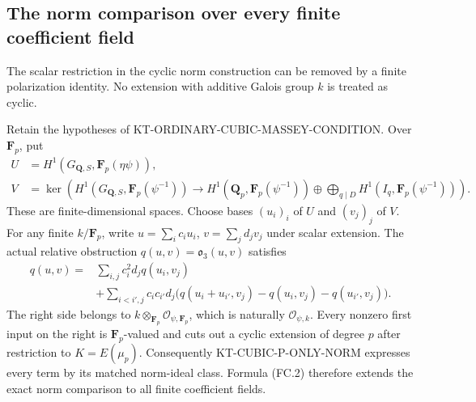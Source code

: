 \subsection{The norm comparison over every finite coefficient field}
\label{sec:kt-finite-coefficient-norm}

The scalar restriction in the cyclic norm construction can be
removed by a finite polarization identity.  No extension with
additive Galois group \(k\) is treated as cyclic.

\begin{proposition}
Retain the hypotheses of KT-ORDINARY-CUBIC-MASSEY-CONDITION.
Over \(\mathbf F_p\), put
\[
\begin{split}
 U&=H^1(G_{\mathbf Q,S},\mathbf F_p(\eta\psi)),\\
 V&=\ker\left(H^1(G_{\mathbf Q,S},\mathbf F_p(\psi^{-1}))
       \longrightarrow H^1(\mathbf Q_p,\mathbf F_p(\psi^{-1}))
           \oplus\bigoplus_{q\mid D}H^1(I_q,\mathbf F_p(\psi^{-1}))
         \right).
\end{split}                                               \tag{FC.1}
\]
These are finite-dimensional spaces.  Choose bases
\((u_i)_i\) of \(U\) and \((v_j)_j\) of \(V\).
For any finite \(k/\mathbf F_p\), write
\(u=\sum_i c_i u_i\), \(v=\sum_j d_jv_j\)
under scalar extension.  The actual relative obstruction
\(q(u,v)=\mathfrak o_3(u,v)\) satisfies
\[
\begin{split}
q(u,v)={}&\sum_{i,j}c_i^2d_jq(u_i,v_j)\\
 &+\sum_{i<i',j}c_ic_{i'}d_j
     \bigl(q(u_i+u_{i'},v_j)-q(u_i,v_j)-q(u_{i'},v_j)\bigr).
\end{split}                                               \tag{FC.2}
\]
The right side belongs to
\(k\otimes_{\mathbf F_p}\mathcal O_{\psi,\mathbf F_p}\),
which is naturally \(\mathcal O_{\psi,k}\).
Every nonzero first input on the right is
\(\mathbf F_p\)-valued and cuts out a cyclic extension
of degree \(p\) after restriction to \(K=E(\mu_p)\).
Consequently KT-CUBIC-P-ONLY-NORM expresses every term
by its matched norm-ideal class.  Formula (FC.2)
therefore extends the exact norm comparison to all
finite coefficient fields.
\end{proposition}

